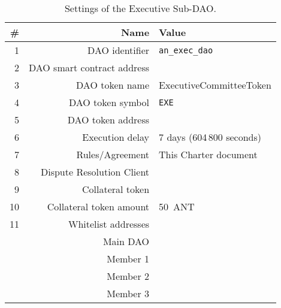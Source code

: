 \begin{table}[h!]
	\caption{Settings of the Executive Sub-DAO.}
	\centering
	\begin{tabular}{rrl}
		\toprule
		\# & Name & Value \\
		\midrule
		1 & \ac{DAO} identifier & \texttt{an\_exec\_dao}\\
		2 & \ac{DAO} smart contract address & \execSubDaoAddr\\
		3 & \ac{DAO} token name & ExecutiveCommitteeToken\\
		4 & \ac{DAO} token symbol & \texttt{EXE}\\
		5 & \ac{DAO} token address & \execSubDaoTokenAddr\\
		6 & Execution delay & 7 days (604\,800 seconds)\\
		7 & Rules/Agreement & This Charter document\\
		8 & Dispute Resolution Client & \aragonCourtAddr\\
		9 & Collateral token & \antTokenAddr\\
		10 & Collateral token amount & 50~\ac{ANT}\\
		11 & Whitelist addresses \\
		& Main \ac{DAO} & \mainDaoAddr\\
		& Member 1 & \execSubDaoMemberAddrI\\
		& Member 2 & \execSubDaoMemberAddrII\\
		& Member 3 & \execSubDaoMemberAddrIII\\
		\bottomrule
	\end{tabular}
\end{table}

\clearpage


